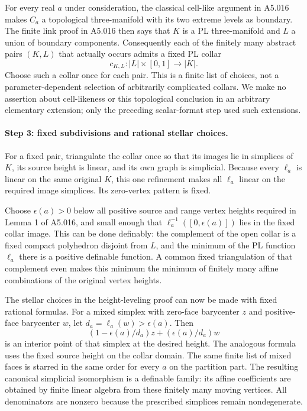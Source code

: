For every real $a$ under consideration, the classical cell-like argument
in A5.016 makes $C_a$ a topological three-manifold with its two extreme
levels as boundary. The finite link proof in A5.016 then says that $K$ is
a PL three-manifold and $L$ a union of boundary components. Consequently
each of the finitely many abstract pairs $(K,L)$ that actually occurs
admits a fixed PL collar
\[
 c_{K,L}:|L|\times[0,1]\longrightarrow|K|.
\]
Choose such a collar once for each pair. This is a finite list of choices,
not a parameter-dependent selection of arbitrarily complicated collars.
We make no assertion about cell-likeness or this topological conclusion in
an arbitrary elementary extension; only the preceding scalar-format step
used such extensions.

\paragraph{Step 3: fixed subdivisions and rational stellar choices.}
For a fixed pair, triangulate the collar once so that its images lie in
simplices of $K$, its source height is linear, and its own graph is
simplicial. Because every $\ell_a$ is linear on the same original $K$,
this one refinement makes all $\ell_a$ linear on the required image
simplices. Its zero-vertex pattern is fixed.

Choose $\epsilon(a)>0$ below all positive source and range vertex heights
required in Lemma 1 of A5.016, and small enough that
$\ell_a^{-1}([0,\epsilon(a)])$ lies in the fixed collar image. This can
be done definably: the complement of the open collar is a fixed compact
polyhedron disjoint from $L$, and the minimum of the PL function $\ell_a$
there is a positive definable function. A common fixed triangulation
of that complement even makes this minimum the minimum of finitely many
affine combinations of the original vertex heights.

The stellar choices in the height-leveling proof can now be made with
fixed rational formulas. For a mixed simplex with zero-face barycenter
$z$ and positive-face barycenter $w$, let $d_a=\ell_a(w)>\epsilon(a)$.
Then
\[
 (1-\epsilon(a)/d_a)z+(\epsilon(a)/d_a)w
 \tag{US.4}
\]
is an interior point of that simplex at the desired height. The analogous
formula uses the fixed source height on the collar domain. The same finite
list of mixed faces is starred in the same order for every $a$ on the
partition part. The resulting canonical simplicial isomorphism is a
definable family: its affine coefficients are obtained by finite linear
algebra from these finitely many moving vertices. All denominators are
nonzero because the prescribed simplices remain nondegenerate.

